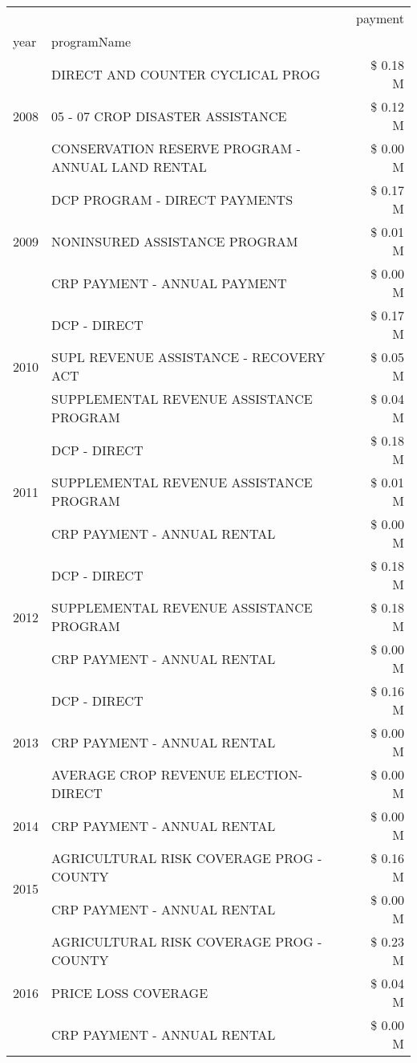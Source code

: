 \begin{tabular}{llr}
\toprule
 &  & payment \\
year & programName &  \\
\midrule
\multirow[t]{3}{*}{2008} & DIRECT AND COUNTER CYCLICAL PROG & \$ 0.18 M \\
 & 05 - 07 CROP DISASTER ASSISTANCE & \$ 0.12 M \\
 & CONSERVATION RESERVE PROGRAM - ANNUAL LAND RENTAL & \$ 0.00 M \\
\cline{1-3}
\multirow[t]{3}{*}{2009} & DCP PROGRAM - DIRECT PAYMENTS & \$ 0.17 M \\
 & NONINSURED ASSISTANCE PROGRAM & \$ 0.01 M \\
 & CRP PAYMENT - ANNUAL PAYMENT & \$ 0.00 M \\
\cline{1-3}
\multirow[t]{3}{*}{2010} & DCP - DIRECT & \$ 0.17 M \\
 & SUPL REVENUE ASSISTANCE - RECOVERY ACT & \$ 0.05 M \\
 & SUPPLEMENTAL REVENUE ASSISTANCE PROGRAM & \$ 0.04 M \\
\cline{1-3}
\multirow[t]{3}{*}{2011} & DCP - DIRECT & \$ 0.18 M \\
 & SUPPLEMENTAL REVENUE ASSISTANCE PROGRAM & \$ 0.01 M \\
 & CRP PAYMENT - ANNUAL RENTAL & \$ 0.00 M \\
\cline{1-3}
\multirow[t]{3}{*}{2012} & DCP - DIRECT & \$ 0.18 M \\
 & SUPPLEMENTAL REVENUE ASSISTANCE PROGRAM & \$ 0.18 M \\
 & CRP PAYMENT - ANNUAL RENTAL & \$ 0.00 M \\
\cline{1-3}
\multirow[t]{3}{*}{2013} & DCP - DIRECT & \$ 0.16 M \\
 & CRP PAYMENT - ANNUAL RENTAL & \$ 0.00 M \\
 & AVERAGE CROP REVENUE ELECTION-DIRECT & \$ 0.00 M \\
\cline{1-3}
2014 & CRP PAYMENT - ANNUAL RENTAL & \$ 0.00 M \\
\cline{1-3}
\multirow[t]{2}{*}{2015} & AGRICULTURAL RISK COVERAGE PROG - COUNTY & \$ 0.16 M \\
 & CRP PAYMENT - ANNUAL RENTAL & \$ 0.00 M \\
\cline{1-3}
\multirow[t]{3}{*}{2016} & AGRICULTURAL RISK COVERAGE PROG - COUNTY & \$ 0.23 M \\
 & PRICE LOSS COVERAGE & \$ 0.04 M \\
 & CRP PAYMENT - ANNUAL RENTAL & \$ 0.00 M \\

\end{tabular}
